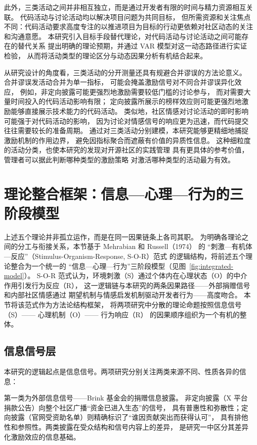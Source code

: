 \documentclass[
    type = master, %
    degree = professional,        %
    decl-page,  %
    twoside,                %
    fontset = fandol %
  ]{njuthesis}
\begin{document}
此外，三类活动之间并非相互独立，而是通过开发者有限的时间与精力资源相互关联。
代码活动与讨论活动均以解决项目问题为共同目标，
但所需资源和关注焦点不同：代码活动要求高度专注的以推进项目为目标的行动更依赖对社区动态的关注和沟通意愿。
本研究引入目标手段替代理论，对代码活动与讨论活动之间可能存在的替代关系
提出明确的理论预期，并通过 VAR 模型对这一动态路径进行实证检验，
从而将活动类型的理论区分与动态因果分析有机结合起来。

从研究设计的角度看，三类活动的分开测量还具有规避合并谬误的方法论意义。
合并谬误发活动合并为单一指标，
可能会掩盖激励信号对不同合并谬误异化效应，
例如，非定向披露可能更强烈地激励需要较低门槛的讨论参与，
而对需要大量时间投入的代码活动影响有限；
定向披露所展示的榜样效应则可能更强烈地激励能够直接展示技术能力的代码活动。
类似地，社区情感对讨论活动的即时影响可能强于对代码活动的影响，
因为讨论对情感信号的响应更为迅速，而代码提交往往需要较长的准备周期。
通过对三类活动分别建模，本研究能够更精细地捕捉激励机制的作用边界，
避免因指标聚合而遮蔽有价值的异质性信息。
这种细粒度的活动分类，也使本研究的发现对开源社区的实践管理
具有更具体的参考价值，管理者可以据此判断哪种类型的激励策略
对激活哪种类型的活动最为有效。

\section{理论整合框架：信息—心理—行为的三阶段模型}

上述五个理论并非孤立运作，而是在同一因果链条上各司其职。
为明确各理论之间的分工与衔接关系，本节基于 
Mehrabian 和 Russell（1974）\cite{mehrabian1974approach} 的
``刺激—有机体—反应''（Stimulus-Organism-Response, S-O-R）范式
的逻辑结构，将前述五个理论整合为一个统一的
``信息—心理—行为''三阶段模型（见图~\ref{fig:integrated-model}）。
S-O-R 范式认为，环境刺激（S）通过个体内在心理状态（O）的中介作用引发行为反应（R），
这一逻辑链与本研究的两条因果路径——外部捐赠信号和内部社区情感通过
期望机制与情感启发机制驱动开发者行为——高度吻合。
本节将该范式作为方法论结构框架，
将两项研究中分散的理论命题按照信息信号（S）—— 心理机制（O）—— 行为响应（R）
的因果顺序组织为一个有机的整体。

\subsection{信息信号层}

本研究的逻辑起点是信息信号。两项研究分别关注两类来源不同、性质各异的信息：

第一类为外部信息信号——Brink 基金会的捐赠信息披露。
非定向披露（X 平台捐款公告）向整个社区广播``资金已进入生态''的信号，
具有普惠性和弥散性；定向披露（官网受资助名单）则精确标识了``谁因贡献突出而获得认可''，
具有排他性和参照性。两类披露在受众结构和信号内容上的差异，
是研究一中区分其差异化激励效应的信息基础。
\end{document}
